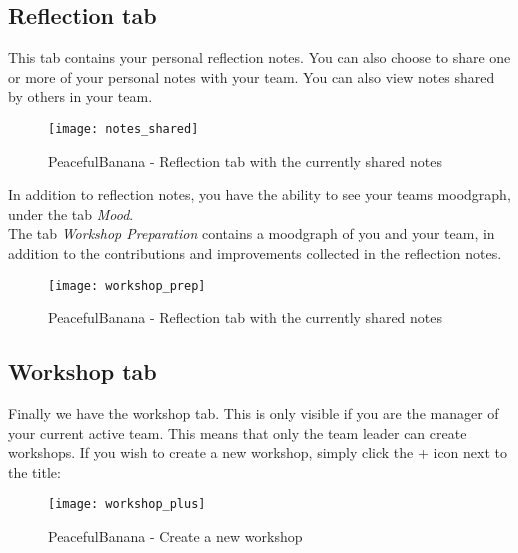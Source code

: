 \subsection{Reflection tab}
This tab contains your personal reflection notes. You can also choose to share one or more of your personal notes with your team. You can also view notes shared by others in your team. \\
\begin{figure}[h!]
\label{milestonessingular}
\centering
	\texttt{[image: notes\_shared]}
\caption{PeacefulBanana - Reflection tab with the currently shared notes}
\end{figure}
In addition to reflection notes, you have the ability to see your teams moodgraph, under the tab \textit{Mood}. \\
The tab \textit{Workshop Preparation} contains a moodgraph of you and your team, in addition to the contributions and improvements collected in the reflection notes. \\
\begin{figure}[h!]
\label{milestonessingular}
\centering
	\texttt{[image: workshop\_prep]}
\caption{PeacefulBanana - Reflection tab with the currently shared notes}
\end{figure}

%
%

\subsection{Workshop tab}
Finally we have the workshop tab. This is only visible if you are the manager of your current active team. This means that only the team leader can create workshops. 
If you wish to create a new workshop, simply click the + icon next to the title: 
\begin{figure}[h!]
\label{milestonessingular}
\centering
	\texttt{[image: workshop\_plus]}
\caption{PeacefulBanana - Create a new workshop}
\end{figure}


